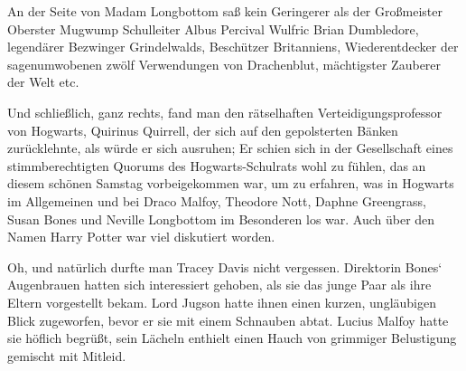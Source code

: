 An der Seite von Madam Longbottom saß kein Geringerer als der Großmeister Oberster Mugwump Schulleiter Albus Percival Wulfric Brian Dumbledore, legendärer Bezwinger Grindelwalds, Beschützer Britanniens, Wiederentdecker der sagenumwobenen zwölf Verwendungen von Drachenblut, mächtigster Zauberer der Welt etc.

Und schließlich, ganz rechts, fand man den rätselhaften Verteidigungsprofessor von Hogwarts, Quirinus Quirrell, der sich auf den gepolsterten Bänken zurücklehnte, als würde er sich ausruhen; Er schien sich in der Gesellschaft eines stimmberechtigten Quorums des Hogwarts-Schulrats wohl zu fühlen, das an diesem schönen Samstag vorbeigekommen war, um zu erfahren, was in Hogwarts im Allgemeinen und bei Draco Malfoy, Theodore Nott, Daphne Greengrass, Susan Bones und Neville Longbottom im Besonderen los war. Auch über den Namen Harry Potter war viel diskutiert worden.

Oh, und natürlich durfte man Tracey Davis nicht vergessen. Direktorin Bones‘ Augenbrauen hatten sich interessiert gehoben, als sie das junge Paar als ihre Eltern vorgestellt bekam. Lord Jugson hatte ihnen einen kurzen, ungläubigen Blick zugeworfen, bevor er sie mit einem Schnauben abtat. Lucius Malfoy hatte sie höflich begrüßt, sein Lächeln enthielt einen Hauch von grimmiger Belustigung gemischt mit Mitleid.

